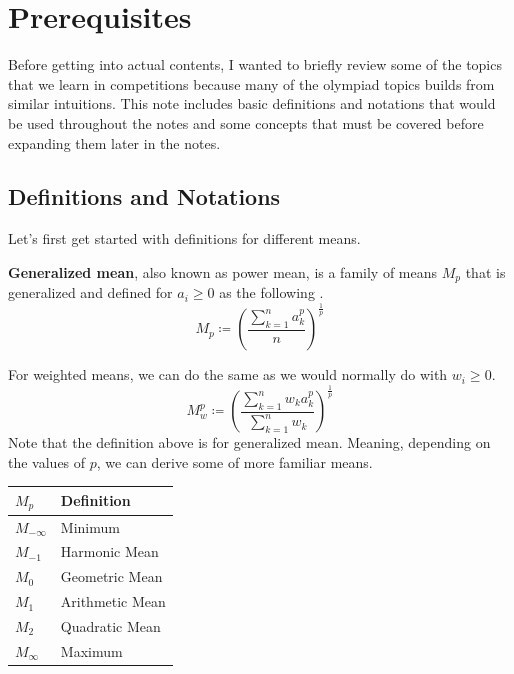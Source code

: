 \documentclass[../../../main.tex]{subfiles}
\begin{document}
\chapter{Prerequisites}

Before getting into actual contents, I wanted to briefly review
some of the topics that we learn in competitions because many of
the olympiad topics builds from similar intuitions. This note
includes basic definitions and notations that would be used
throughout the notes and some concepts that must be covered before
expanding them later in the notes.

\section{Definitions and Notations}

Let's first get started with definitions for different means.

\begin{definition}{}{}
\textbf{Generalized mean}, also known as power mean, is a family of
means $M_p$ that is generalized and defined for $a_i \geq 0$ as the
following \cite{MATH01-4}.
\[
M_p
\coloneqq \left( \frac{\sum_{k=1}^n a_k^p}{n} \right)^\frac{1}{p}
\]
\end{definition}

For weighted means, we can do the same as we would normally do with
$w_i \geq 0$.
\[
M_w^p
\coloneqq \left(
    \frac{ \sum_{k=1}^n w_k a_k^p }{ \sum_{k=1}^n w_k }
\right)^\frac{1}{p}
\]
Note that the definition above is for generalized mean. Meaning,
depending on the values of $p$, we can derive some of more familiar
means.

\begin{center}
\begin{tabular}{|p{}|p{}|}
    \hline
    $M_p$         & Definition \\
    \hline
    $M_{-\infty}$ & Minimum \\
    $M_{-1}$      & Harmonic Mean \\
    $M_0$         & Geometric Mean \\
    $M_1$         & Arithmetic Mean \\
    $M_2$         & Quadratic Mean \\
    $M_\infty$    & Maximum \\
    \hline
\end{tabular}
\end{center}
\end{document}
